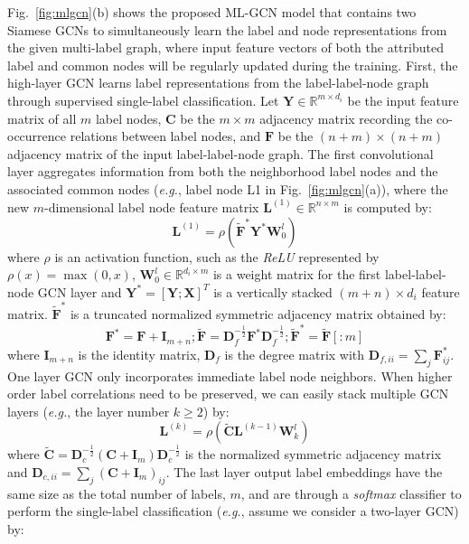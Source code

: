 \documentclass[conference]{IEEEtran}
\begin{document}
Fig.~\ref{fig:mlgcn}(b) shows the proposed ML-GCN model that contains two Siamese GCNs to simultaneously learn the label and node representations from the given multi-label graph, where input feature vectors of both the attributed label and common nodes will be regularly updated during the training. First, the high-layer GCN learns label representations from the label-label-node graph through supervised single-label classification. Let $\mathbf{Y} \in \mathbb{R}^{m \times d_i}$ be the input feature matrix of all $m$ label nodes, $\mathbf{C}$ be the $m \times m$ adjacency matrix recording the co-occurrence relations between label nodes, and $\mathbf{F}$ be the $(n+m) \times (n+m)$ adjacency matrix of the input label-label-node graph. The first convolutional layer aggregates information from both the neighborhood label nodes and the associated common nodes (\textit{e.g.}, label node L1 in Fig.~\ref{fig:mlgcn}(a)), where the new $m$-dimensional label node feature matrix $\mathbf{L}^{(1)} \in \mathbb{R}^{n \times m}$ is computed by:
\begin{equation}
\mathbf{L}^{(1)} = \rho (\tilde{\mathbf{F}}^{*} \mathbf{Y}^{*} \mathbf{W}_{0}^{l})
\end{equation}
where $\rho$ is an activation function, such as the \textit{ReLU} represented by $\rho (x) = \max (0,x)$, $\mathbf{W}_{0}^{l} \in \mathbb{R}^{d_i\times m}$ is a weight matrix for the first label-label-node GCN layer and $\mathbf{Y}^{*}=[\mathbf{Y};\mathbf{X}]^{T}$ is a vertically stacked $(m+n)\times d_i$ feature matrix. $\tilde{\mathbf{F}}^{*}$ is a truncated normalized symmetric adjacency matrix obtained by:
\begin{equation}
\mathbf{F}^{*} = \mathbf{F}+\mathbf{I}_{m+n};  \tilde{\mathbf{F}} = \mathbf{D}_{f}^{-\frac{1}{2}} \mathbf{F}^{*} \mathbf{D}_{f}^{ - \frac{1}{2}}; \tilde{\mathbf{F}}^{*} = \tilde{\mathbf{F}}[:m]
\end{equation}
where $\mathbf{I}_{m+n}$ is the identity matrix, $\mathbf{D}_f$ is the degree matrix with $\mathbf{D}_{f,ii}=\sum_{j}\mathbf{F}^{*}_{ij}$. One layer GCN only incorporates immediate label node neighbors. When higher order label correlations need to be preserved, we can easily stack multiple GCN layers (\textit{e.g.}, the layer number $k \geq 2$) by:
\begin{equation}
\mathbf{L}^{(k)} = \rho (\tilde{\mathbf{C}}\mathbf{L}^{(k-1)} \mathbf{W}_k^l) 
\end{equation}
where $\tilde{\mathbf{C}} = \mathbf{D}_{c}^{-\frac{1}{2}} (\mathbf{C}+\mathbf{I}_m) \mathbf{D}_{c}^{ - \frac{1}{2}}$ is the normalized symmetric adjacency matrix and $\mathbf{D}_{c,ii}=\sum_{j}(\mathbf{C}+\mathbf{I}_m)_{ij}$. The last layer output label embeddings have the same size as the total number of labels, $m$, and are through a \textit{softmax} classifier to perform the single-label classification (\textit{e.g.}, assume we consider a two-layer GCN) by:
\end{document}
